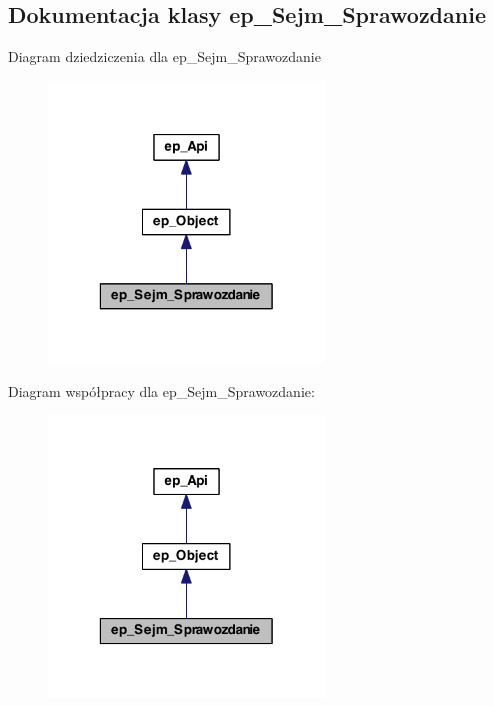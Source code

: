 \hypertarget{classep___sejm___sprawozdanie}{\subsection{Dokumentacja klasy ep\-\_\-\-Sejm\-\_\-\-Sprawozdanie}
\label{classep___sejm___sprawozdanie}
}


Diagram dziedziczenia dla ep\-\_\-\-Sejm\-\_\-\-Sprawozdanie\nopagebreak
\begin{figure}[H]
\begin{center}
\leavevmode
\includegraphics[width=208pt]{classep___sejm___sprawozdanie__inherit__graph}
\end{center}
\end{figure}


Diagram współpracy dla ep\-\_\-\-Sejm\-\_\-\-Sprawozdanie\-:\nopagebreak
\begin{figure}[H]
\begin{center}
\leavevmode
\includegraphics[width=208pt]{classep___sejm___sprawozdanie__coll__graph}
\end{center}
\end{figure}
